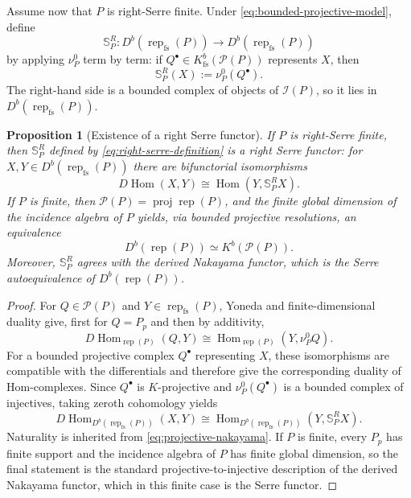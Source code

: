 \documentclass[12pt,reqno]{amsart}
\newtheorem{proposition}[theorem]{Proposition}
\theoremstyle{definition}
\theoremstyle{remark}
\newcommand{\Rep}{\operatorname{rep}}
\newcommand{\Hom}{\operatorname{Hom}}
\begin{document}
Assume now that $P$ is right-Serre finite.  Under
\eqref{eq:bounded-projective-model}, define
\[
\mathbb S_P^R:
D^b(\Rep_{\mathrm{fs}}(P))
\longrightarrow
D^b(\Rep_{\mathrm{fs}}(P))
\]
by applying $\nu_P^0$ term by term: if $Q^\bullet\in
K^b_{\mathrm{fs}}(\mathcal P(P))$ represents $X$, then
\begin{equation}\label{eq:right-serre-definition}
\mathbb S_P^R(X):=\nu_P^0(Q^\bullet).
\end{equation}
The right-hand side is a bounded complex of objects of $\mathcal I(P)$, so it
lies in $D^b(\Rep_{\mathrm{fs}}(P))$.

\begin{proposition}[Existence of a right Serre functor]
\label{prop:right-serre-existence}
If $P$ is right-Serre finite, then $\mathbb S_P^R$ defined by
\eqref{eq:right-serre-definition} is a right Serre functor: for
$X,Y\in D^b(\Rep_{\mathrm{fs}}(P))$ there are bifunctorial isomorphisms
\[
D\Hom(X,Y)\cong\Hom(Y,\mathbb S_P^R X).
\]
If $P$ is finite, then $\mathcal P(P)=\operatorname{proj}\Rep(P)$, and
the finite global dimension of the incidence algebra of $P$ yields, via
bounded projective resolutions, an equivalence
\[
D^b(\Rep(P))\simeq K^b(\mathcal P(P)).
\]
Moreover, $\mathbb S_P^R$ agrees with the derived Nakayama functor, which is
the Serre autoequivalence of $D^b(\Rep(P))$.
\end{proposition}

\begin{proof}
For $Q\in\mathcal P(P)$ and $Y\in\Rep_{\mathrm{fs}}(P)$, Yoneda and
finite-dimensional duality give, first for $Q=P_p$ and then by additivity,
\[
D\Hom_{\Rep(P)}(Q,Y)
\cong
\Hom_{\Rep(P)}(Y,\nu_P^0Q).
\]
For a bounded projective complex $Q^\bullet$ representing $X$, these
isomorphisms are compatible with the differentials and therefore give the
corresponding duality of Hom-complexes.  Since $Q^\bullet$ is $K$-projective
and $\nu_P^0(Q^\bullet)$ is a bounded complex of injectives, taking
zeroth cohomology yields
\[
D\Hom_{D^b(\Rep_{\mathrm{fs}}(P))}(X,Y)
\cong
\Hom_{D^b(\Rep_{\mathrm{fs}}(P))}(Y,\mathbb S_P^R X).
\]
Naturality is inherited from \eqref{eq:projective-nakayama}.  If $P$ is
finite, every $P_p$ has finite support and the incidence algebra of $P$ has
finite global dimension, so the final statement is the standard
projective-to-injective description of the derived Nakayama functor, which in
this finite case is the Serre functor.
\end{proof}
\end{document}
